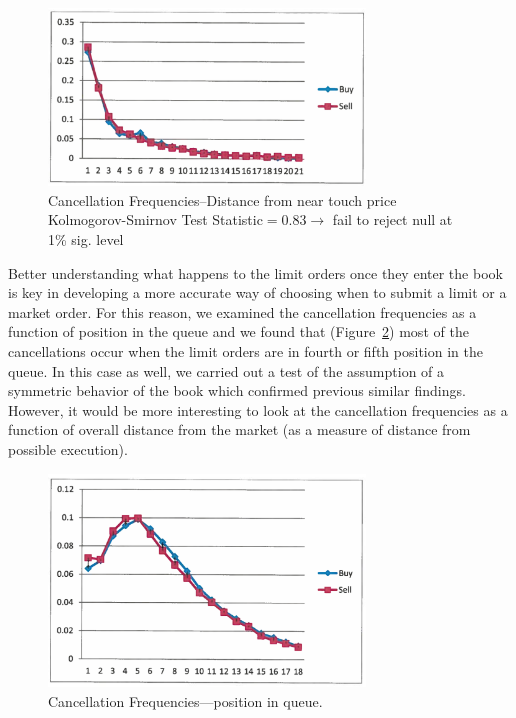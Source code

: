 	\begin{figure}[!ht]
   	\centering
   	\includegraphics[width=0.75\textwidth]{chapters/chapter_trade_data_models/figures/canfreqnear.png} 
   	\caption{Cancellation Frequencies--Distance from near touch price \\ Kolmogorov-Smirnov Test Statistic$=0.83\to$ fail to reject null at 1\% sig. level \label{fig:canfreqnear}}
	\end{figure}


Better understanding what happens to the limit orders once they enter the book is key in developing a more accurate way of choosing when to submit a limit or a market order. For this reason, we examined the cancellation frequencies as a function of position in the queue and we found that (Figure~\ref{fig:canfreq}) most of the cancellations occur when the limit orders are in fourth or fifth position in the queue. In this case as well, we carried out a test of the assumption of a symmetric behavior of the book which confirmed previous similar findings. However, it would be more interesting to look at the cancellation frequencies as a function of overall distance from the market (as a measure of distance from possible execution). 
	\begin{figure}[!ht]
   	\centering
   	\includegraphics[width=0.75\textwidth]{chapters/chapter_trade_data_models/figures/canfreq.png} 
   	\caption{Cancellation Frequencies---position in queue. \label{fig:canfreq}}
	\end{figure}


